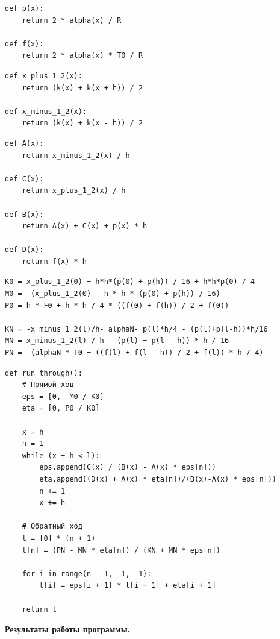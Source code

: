 \documentclass[a4paper,14pt]{extreport} %
\begin{document}
\begin{lstlisting}[caption=Выполненные замены]
def p(x):
    return 2 * alpha(x) / R

def f(x):
    return 2 * alpha(x) * T0 / R
\end{lstlisting}

\begin{lstlisting}[caption=Метод средних для вычисления значения Х]
def x_plus_1_2(x):
    return (k(x) + k(x + h)) / 2

def x_minus_1_2(x):
    return (k(x) + k(x - h)) / 2
\end{lstlisting}

\begin{lstlisting}[caption=Параметры разностной схемы]
def A(x):
    return x_minus_1_2(x) / h

def C(x):
    return x_plus_1_2(x) / h

def B(x):
    return A(x) + C(x) + p(x) * h

def D(x):
    return f(x) * h
\end{lstlisting}

\begin{lstlisting}[caption=Краевые условия]
K0 = x_plus_1_2(0) + h*h*(p(0) + p(h)) / 16 + h*h*p(0) / 4
M0 = -(x_plus_1_2(0) - h * h * (p(0) + p(h)) / 16)
P0 = h * F0 + h * h / 4 * ((f(0) + f(h)) / 2 + f(0))

KN = -x_minus_1_2(l)/h- alphaN- p(l)*h/4 - (p(l)+p(l-h))*h/16
MN = x_minus_1_2(l) / h - (p(l) + p(l - h)) * h / 16
PN = -(alphaN * T0 + ((f(l) + f(l - h)) / 2 + f(l)) * h / 4)
\end{lstlisting}

\begin{lstlisting}[caption=Метод прогонки]
def run_through():
    # Прямой ход
    eps = [0, -M0 / K0]
    eta = [0, P0 / K0]

    x = h
    n = 1
    while (x + h < l):
        eps.append(C(x) / (B(x) - A(x) * eps[n]))
        eta.append((D(x) + A(x) * eta[n])/(B(x)-A(x) * eps[n]))
        n += 1
        x += h

    # Обратный ход
    t = [0] * (n + 1)
    t[n] = (PN - MN * eta[n]) / (KN + MN * eps[n])

    for i in range(n - 1, -1, -1):
        t[i] = eps[i + 1] * t[i + 1] + eta[i + 1]

    return t
\end{lstlisting}

\newpage 
\textbf{Результаты работы программы. }
\end{document}
